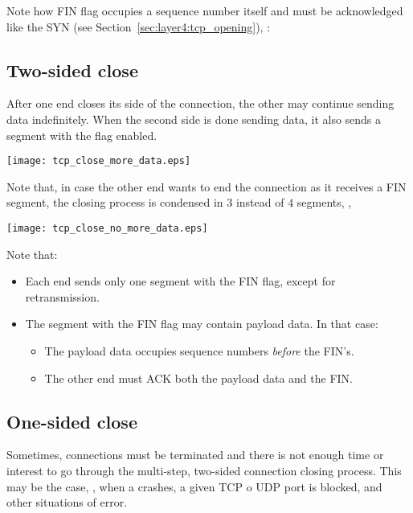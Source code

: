 Note how FIN flag occupies a sequence number itself and must be acknowledged like the SYN 
(see Section~\ref{sec:layer4:tcp_opening}), \eg:

\subsection{Two-sided close}

After one end closes its side of the connection, the other may continue sending data indefinitely. 
When the second side is done sending data, it also sends a segment with the  flag enabled.


\begin{center}
\texttt{[image: tcp\_close\_more\_data.eps]}
\end{center}

Note that, in case the other end wants to end the connection as it receives a FIN segment,
the closing process is condensed in $3$ instead of $4$ segments, \eg,


\begin{center}
\texttt{[image: tcp\_close\_no\_more\_data.eps]}
\end{center}



\begin{remark}
Note that:
\begin{itemize}
\item Each end sends only one segment with the FIN flag, except for retransmission.
\item The segment with the FIN flag may contain payload data. In that case:
  \begin{itemize}
  \item The payload data occupies sequence numbers \textit{before} the FIN's.
  \item The other end must ACK both the payload data and the FIN.
  \end{itemize}
\end{itemize}
\end{remark}


\subsection{One-sided close}

Sometimes, connections must be terminated and there is not enough time or interest 
to go through the multi-step, two-sided connection closing process.
% 
This may be the case, \eg, when a  crashes, a given TCP o UDP port is 
blocked, and other situations of error.

